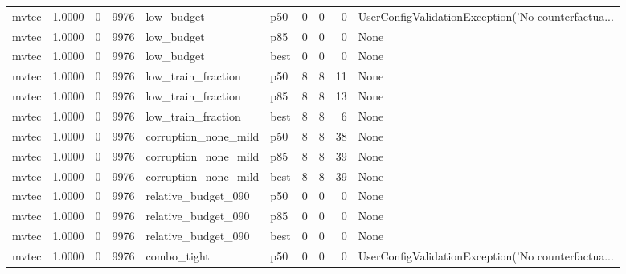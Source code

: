 \begin{tabular}{lrrrllrrrl}
   mvtec &    1.0000 &    0 &   9976 &           low\_budget &    p50 &               0 &          0 &       0 & UserConfigValidationException('No counterfactua... \\
   mvtec &    1.0000 &    0 &   9976 &           low\_budget &    p85 &               0 &          0 &       0 &                                               None \\
   mvtec &    1.0000 &    0 &   9976 &           low\_budget &   best &               0 &          0 &       0 &                                               None \\
   mvtec &    1.0000 &    0 &   9976 &   low\_train\_fraction &    p50 &               8 &          8 &      11 &                                               None \\
   mvtec &    1.0000 &    0 &   9976 &   low\_train\_fraction &    p85 &               8 &          8 &      13 &                                               None \\
   mvtec &    1.0000 &    0 &   9976 &   low\_train\_fraction &   best &               8 &          8 &       6 &                                               None \\
   mvtec &    1.0000 &    0 &   9976 & corruption\_none\_mild &    p50 &               8 &          8 &      38 &                                               None \\
   mvtec &    1.0000 &    0 &   9976 & corruption\_none\_mild &    p85 &               8 &          8 &      39 &                                               None \\
   mvtec &    1.0000 &    0 &   9976 & corruption\_none\_mild &   best &               8 &          8 &      39 &                                               None \\
   mvtec &    1.0000 &    0 &   9976 &  relative\_budget\_090 &    p50 &               0 &          0 &       0 &                                               None \\
   mvtec &    1.0000 &    0 &   9976 &  relative\_budget\_090 &    p85 &               0 &          0 &       0 &                                               None \\
   mvtec &    1.0000 &    0 &   9976 &  relative\_budget\_090 &   best &               0 &          0 &       0 &                                               None \\
   mvtec &    1.0000 &    0 &   9976 &          combo\_tight &    p50 &               0 &          0 &       0 & UserConfigValidationException('No counterfactua... \\

\end{tabular}
